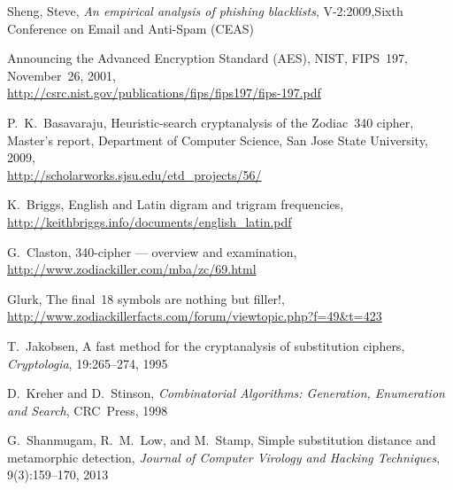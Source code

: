 %
%
%
%
\begin{thebibliography}{10}

 Sheng, Steve, {\it An empirical analysis of phishing blacklists}, V-2:2009,Sixth Conference on Email and Anti-Spam (CEAS)

 Announcing the Advanced Encryption Standard (AES), NIST, 
FIPS~197, November~26, 2001,\\
\url{http://csrc.nist.gov/publications/fips/fips197/fips-197.pdf}

 P.~K.~Basavaraju, Heuristic-search cryptanalysis of the Zodiac~340 cipher,
Master's report, Department of Computer Science, San Jose State University, 2009,\\
\url{http://scholarworks.sjsu.edu/etd_projects/56/}

 K.~Briggs, English and Latin digram and trigram frequencies,\\
\url{http://keithbriggs.info/documents/english_latin.pdf}

 G.~Claston, 340-cipher --- overview and examination,\\
\url{http://www.zodiackiller.com/mba/zc/69.html}

 Glurk, The final~18 symbols are nothing but filler!,\\
\url{http://www.zodiackillerfacts.com/forum/viewtopic.php?f=49&t=423}

 T.~Jakobsen, A fast method for the cryptanalysis of substitution ciphers,
{\it Cryptologia}, 19:265--274, 1995

 D.~Kreher and D.~Stinson, {\it Combinatorial Algorithms: 
Generation, Enumeration and Search}, CRC~Press, 1998

 G.~Shanmugam, R.~M.~Low, and M.~Stamp, 
Simple substitution distance and metamorphic detection,
{\it Journal of Computer Virology and Hacking Techniques},  9(3):159--170, 2013


\end{thebibliography}
